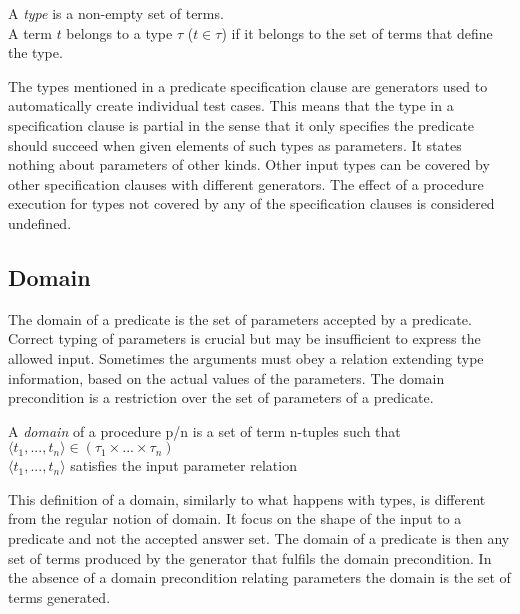 \begin{definition}
\label{def:type}
A {\em type} is a non-empty set of terms.\\
A term $t$ belongs to a type $\tau$ ($t \in \tau$) if it belongs to the set of
terms that define the type.
\end{definition}


The types mentioned in a predicate specification clause are \plqc{}
generators used to automatically create individual test cases.
%
This means that the type in a specification clause is partial in the
sense that it only specifies the predicate should succeed when given
elements of such types as parameters.
%
It states nothing about parameters of other kinds.
%
Other input types can be covered by other specification clauses with
different generators.
%
The effect of a procedure execution for types not covered by any of the
specification clauses is considered undefined.


\subsection{Domain}

The domain of a predicate is the set of parameters accepted by a
predicate.
%
Correct typing of parameters is crucial but may be insufficient to
express the allowed input.
%
Sometimes the arguments must obey a relation extending type information,
based on the actual values of the parameters.
%
The domain precondition is a restriction over the set of parameters of a
predicate.


\begin{definition}
\label{def:domain}
A {\em domain} of a procedure p/n is a set of term
n-tuples such that\\
\qquad $\langle t_1,...,t_n \rangle \in (\tau_1 \times ... \times
\tau_n)$\\
\qquad $\langle t_1,...,t_n \rangle$ satisfies the input parameter relation
\end{definition}


This definition of a domain, similarly to what happens with types, is
different from the regular notion of domain.
%
It focus on the shape of the input to a predicate and not the accepted
answer set.
%
The \plqc{} domain of a predicate is then any set of terms produced by
the generator that fulfils the domain precondition.
%
In the absence of a domain precondition relating parameters the domain
is the set of terms generated.


